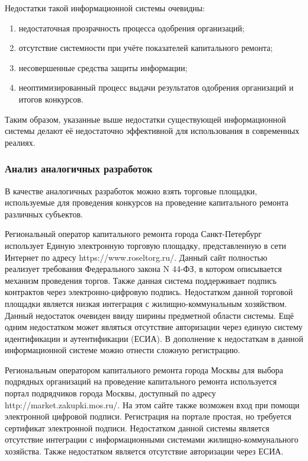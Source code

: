 Недостатки такой информационной системы очевидны:

\begin{enumerate}
	\item недостаточная прозрачность процесса одобрения организаций;
	\item отсутствие системности при учёте показателей капитального ремонта;
	\item несовершенные средства защиты информации;
	\item неоптимизированный процесс выдачи результатов одобрения организаций и итогов конкурсов.
\end{enumerate}

Таким образом, указанные выше недостатки существующей информационной системы делают её недостаточно эффективной для использования в современных реалиях.

\subsubsection{Анализ аналогичных разработок}

В качестве аналогичных разработок можно взять торговые площадки, используемые для проведения конкурсов на проведение капитального ремонта различных субъектов.

Региональный оператор капитального ремонта города Санкт-Петербург использует Единую электронную торговую площадку, представленную в сети Интернет по адресу https://www.roseltorg.ru/.
Данный сайт полностью реализует требования Федерального закона N 44-ФЗ, в котором описывается механизм проведения торгов.
Также данная система поддерживает подпись контрактов через электронно-цифровую подпись.
Недостатком данной торговой площадки является низкая интеграция с жилищно-коммунальным хозяйством.
Данный недостаток очевиден ввиду ширины предметной области системы.
Ещё одним недостатком может являться отсутствие авторизации через единую систему идентификации и аутентификации (ЕСИА).
В дополнение к недостаткам в данной информационной системе можно отнести сложную регистрацию.

Региональным оператором капитального ремонта города Москвы для выбора подрядных организаций на проведение капитального ремонта используется портал подрядчиков города Москвы, доступный по адресу http://market.zakupki.mos.ru/.
На этом сайте также возможен вход при помощи электронной цифровой подписи.
Регистрация на портале простая, но требуется сертификат электронной подписи.
Недостатком данной системы является отсутствие интеграции с информационными системами жилищно-коммунального хозяйства.
Также недостатком является отсутствие авторизации через ЕСИА.

